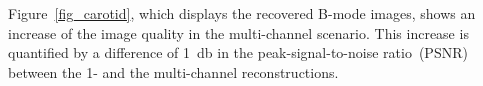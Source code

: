 \documentclass[journal]{IEEEtran}
\theoremstyle{definition}
\begin{document}
Figure~\ref{fig_carotid}, which displays the recovered B-mode images, shows an increase of the image quality in the multi-channel scenario. This increase is quantified by a difference of \SI{1}{\decibel} in the peak-signal-to-noise ratio~(PSNR) between the 1- and the multi-channel reconstructions. 
\setlength{\CohSubFigWidth}{0.24\textwidth}
\end{document}
